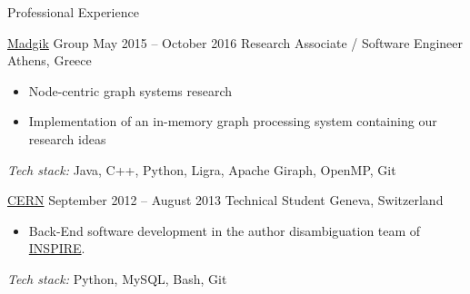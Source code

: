 \documentclass{resume}
\begin{document}
\begin{rSection}{Professional Experience}
\begin{rSubsection}
  {\href{https://www.madgik.di.uoa.gr/about}{Madgik} Group}
  {May 2015 -- October 2016}
  {Research Associate / Software Engineer}
  {Athens, Greece}
    \begin{itemize}[label={-}]
\setlength\itemsep{-0.3em}
   \item Node-centric graph systems research
   \item Implementation of an in-memory graph processing system containing our research ideas
    \end{itemize}
   \textit{Tech stack:} Java, C++, Python, Ligra, Apache Giraph, OpenMP, Git

   
\end{rSubsection}


\begin{rSubsection}
  {\href{https://home.cern/about}{CERN}}
  {September 2012 -- August 2013}
  {Technical Student}
  {Geneva, Switzerland}
  \begin{itemize}[label={-}]
\setlength\itemsep{-0.3em}
   	\item Back-End software development in the author disambiguation team of \href{http://inspirehep.net/}{INSPIRE}. 
  \end{itemize}
    \textit{Tech stack:} Python, MySQL, Bash, Git
\end{rSubsection}





\end{rSection}
\end{document}

